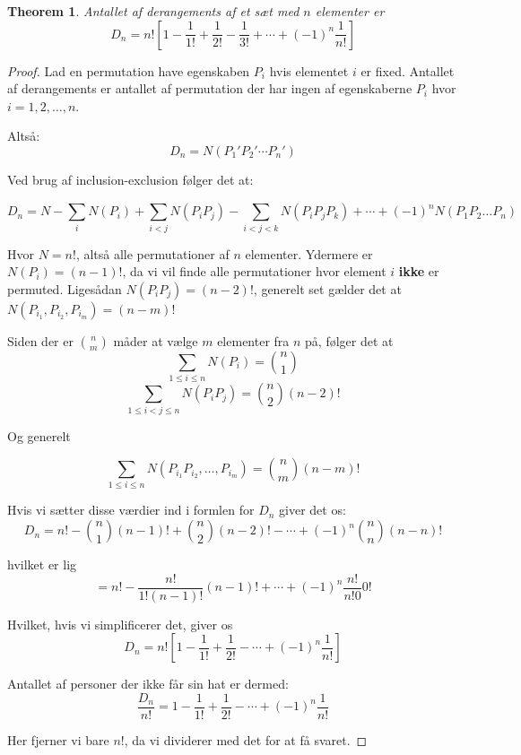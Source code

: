 \documentclass[11pt]{article}
\newtheorem{theorem}{Theorem}
\theoremstyle{definition}
\theoremstyle{remark}
\begin{document}
\begin{theorem}
  Antallet af derangements af et sæt med $n$ elementer er
  \[
D_{n} = n! \left[ 1 - \frac{1}{1!} + \frac{1}{2!} - \frac{1}{3!} +\cdots + (-1)^{n} \frac{1}{n!} \right]
  \]
\end{theorem}

\begin{proof}
Lad en permutation have egenskaben $P_{i}$ hvis elementet $i$ er fixed. Antallet af derangements er antallet af permutation der har ingen af egenskaberne $P_i$ hvor $i = 1, 2, \ldots, n$.

Altså:
\[
D_{n} = N(P_{1}' P_{2}' \cdots P_{n}')
\]

Ved brug af inclusion-exclusion følger det at:

\[
D_{n} = N - \sum_{i}^{}N(P_{i}) + \sum_{i < j}^{}N(P_{i}P_{j}) - \sum_{i < j < k}^{} N(P_{i}P_{j}P_{k}) + \cdots + (-1)^{n}N(P_{1}P_{2} \ldots P_{n})
\]

Hvor $N = n!$, altså alle permutationer af $n$ elementer. Ydermere er $N(P_{i}) = (n-1)!$, da vi vil finde alle permutationer hvor element $i$ \textbf{ikke} er permuted. Ligesådan $N(P_{i}P_{j}) = (n-2)!$, generelt set gælder det at $N(P_{i_{1}}, P_{i_{2}}, P_{i_{m}}) = (n-m)!$

Siden der er $\binom{n}{m}$ måder at vælge $m$ elementer fra $n$ på, følger det at
\[
\sum_{1 \leq i \leq n}^{} N(P_{i}) = \binom{n}{1}
\]
\[
\sum_{1 \leq i <j\leq n}^{} N(P_{i}P_{j}) = \binom{n}{2}(n-2)!
\]

Og generelt


\[
\sum_{1 \leq i \leq n}^{} N(P_{i_{1}}P_{i_{2}}, \ldots, P_{i_{m}}) = \binom{n}{m}(n-m)!
\]

Hvis vi sætter disse værdier ind i formlen for $D_{n}$ giver det os:
\[
D_{n} = n! - \binom{n}{1} (n-1)! + \binom{n}{2}(n-2)! - \cdots + (-1)^{n}\binom{n}{n}(n-n)!
\]

hvilket er lig
\[
= n! - \frac{n!}{1!(n-1)!}(n-1)! + \cdots + (-1)^{n} \frac{n!}{n!0}0!
\]

Hvilket, hvis vi simplificerer det, giver os
\[
D_{n} = n! \left[ 1 - \frac{1}{1!} + \frac{1}{2!} - \cdots + (-1)^{n} \frac{1}{n!} \right]
\]

Antallet af personer der ikke får sin hat er dermed:
\[
\frac{D_{n}}{n!} = 1 - \frac{1}{1!} + \frac{1}{2!} - \cdots + (-1)^{n } \frac{1}{n!}
\]

Her fjerner vi bare $n!$, da vi dividerer med det for at få svaret. 
\end{proof}
\end{document}
